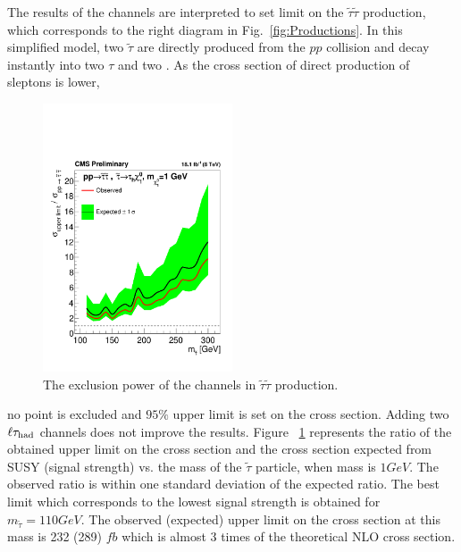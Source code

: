 The results of the \tauTau channels are interpreted to set limit on the $\tilde{\tau}\tilde{\tau}$ production, which corresponds to the right diagram in Fig.~\ref{fig:Productions}. In this simplified model, two $\tilde{\tau}$ are directly produced from the $pp$ collision and decay instantly into two $\tau$ and two \PSGczDo. As the cross section of direct production of sleptons is lower,
\begin{linenomath}
\begin{figure}[h]
\centering
\includegraphics[width=0.5\textwidth,keepaspectratio=true]{StatisticsFig/ExclusionSTauSTauLsp1.pdf}
\caption{The exclusion power of the \tauTau channels in $\tilde{\tau}\tilde{\tau}$ production.}
\label{fig:limit_stau_stau}
\end{figure}
\end{linenomath}
 no point is excluded and $95\%$ upper limit is set on the cross section. Adding two $\ell\tau_{\rm had}$ channels does not improve the results.
Figure ~\ref{fig:limit_stau_stau} represents the ratio of the 
obtained upper limit on the cross section and the cross section expected from SUSY (signal strength) vs. the mass of the $\tilde{\tau}$ particle, when \PSGczDo mass is $1 GeV$.
The observed ratio is within one standard deviation of  the expected ratio.
The best limit which corresponds to the lowest signal strength is obtained for $m_{\tilde{\tau}}=110 GeV$. The observed (expected) upper limit on the cross section at this mass is 232 (289) $fb$ which is almost 3 times of the theoretical NLO cross section.


